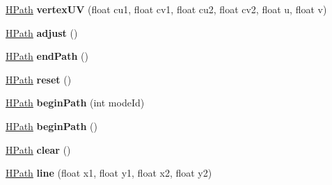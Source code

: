 \begin{DoxyCompactItemize}
\item 
\hypertarget{classhype_1_1extended_1_1drawable_1_1_h_path_ac5e2d37ebd41ad7ff7e455415e2c1a34}{\hyperlink{classhype_1_1extended_1_1drawable_1_1_h_path}{H\-Path} {\bfseries vertex\-U\-V} (float cu1, float cv1, float cu2, float cv2, float u, float v)}\label{classhype_1_1extended_1_1drawable_1_1_h_path_ac5e2d37ebd41ad7ff7e455415e2c1a34}

\item 
\hypertarget{classhype_1_1extended_1_1drawable_1_1_h_path_aee0fe262a32c23778f391489646147c7}{\hyperlink{classhype_1_1extended_1_1drawable_1_1_h_path}{H\-Path} {\bfseries adjust} ()}\label{classhype_1_1extended_1_1drawable_1_1_h_path_aee0fe262a32c23778f391489646147c7}

\item 
\hypertarget{classhype_1_1extended_1_1drawable_1_1_h_path_a7fab443b9c46241fe59fd7e2756b6bef}{\hyperlink{classhype_1_1extended_1_1drawable_1_1_h_path}{H\-Path} {\bfseries end\-Path} ()}\label{classhype_1_1extended_1_1drawable_1_1_h_path_a7fab443b9c46241fe59fd7e2756b6bef}

\item 
\hypertarget{classhype_1_1extended_1_1drawable_1_1_h_path_aad63492f2a51cf32bcbe1b6ea95c94d4}{\hyperlink{classhype_1_1extended_1_1drawable_1_1_h_path}{H\-Path} {\bfseries reset} ()}\label{classhype_1_1extended_1_1drawable_1_1_h_path_aad63492f2a51cf32bcbe1b6ea95c94d4}

\item 
\hypertarget{classhype_1_1extended_1_1drawable_1_1_h_path_a1bf9a46e9a9ceff774210912fe440af6}{\hyperlink{classhype_1_1extended_1_1drawable_1_1_h_path}{H\-Path} {\bfseries begin\-Path} (int mode\-Id)}\label{classhype_1_1extended_1_1drawable_1_1_h_path_a1bf9a46e9a9ceff774210912fe440af6}

\item 
\hypertarget{classhype_1_1extended_1_1drawable_1_1_h_path_a1c09ec8d64673458c518929cd9d6cc2e}{\hyperlink{classhype_1_1extended_1_1drawable_1_1_h_path}{H\-Path} {\bfseries begin\-Path} ()}\label{classhype_1_1extended_1_1drawable_1_1_h_path_a1c09ec8d64673458c518929cd9d6cc2e}

\item 
\hypertarget{classhype_1_1extended_1_1drawable_1_1_h_path_a8f52b87a42368d367463cbcf5a62b0f2}{\hyperlink{classhype_1_1extended_1_1drawable_1_1_h_path}{H\-Path} {\bfseries clear} ()}\label{classhype_1_1extended_1_1drawable_1_1_h_path_a8f52b87a42368d367463cbcf5a62b0f2}

\item 
\hypertarget{classhype_1_1extended_1_1drawable_1_1_h_path_a1b0235bd98e1e587f2575201e12b9682}{\hyperlink{classhype_1_1extended_1_1drawable_1_1_h_path}{H\-Path} {\bfseries line} (float x1, float y1, float x2, float y2)}\label{classhype_1_1extended_1_1drawable_1_1_h_path_a1b0235bd98e1e587f2575201e12b9682}


\end{DoxyCompactItemize}
